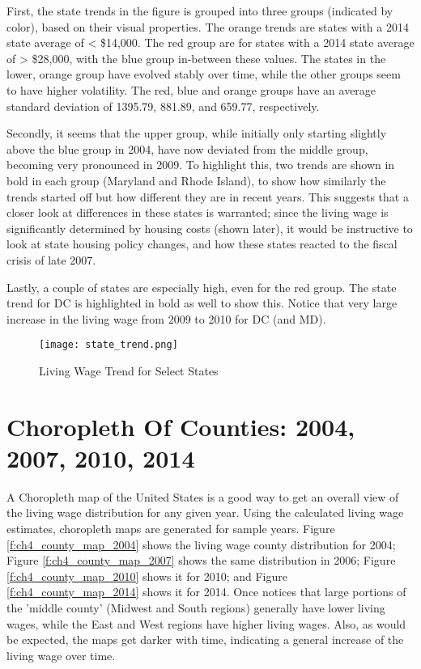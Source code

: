 First, the state trends in the figure is grouped into three groups (indicated by color), based on their visual properties. The orange trends are states with a 2014 state average of < \$14,000. The red group are for states with a 2014 state average of > \$28,000, with the blue group in-between these values. The states in the lower, orange group have evolved stably over time, while the other groups seem to have higher volatility. The red, blue and orange groups have an average standard deviation of 1395.79, 881.89, and 659.77, respectively.

Secondly, it seems that the upper group, while initially only starting slightly above the blue group in 2004, have now deviated from the middle group, becoming very pronounced in 2009. To highlight this, two trends are shown in bold in each group (Maryland and Rhode Island), to show how similarly the trends started off but how different they are in recent years. This suggests that a closer look at differences in these states is warranted; since the living wage is significantly determined by housing costs (shown later), it would be instructive to look at state housing policy changes, and how these states reacted to the fiscal crisis of late 2007.

Lastly, a couple of states are especially high, even for the red group. The state trend for DC is highlighted in bold as well to show this. Notice that very large increase in the living wage from 2009 to 2010 for DC (and MD).

\begin{figure}[H]
    \centering
        \texttt{[image: state\_trend.png]}
        \caption{Living Wage Trend for Select States}
    \label{f:ch4_state_trend}
\end{figure}



\section{Choropleth Of Counties: 2004, 2007, 2010, 2014}

A Choropleth map of the United States is a good way to get an overall view of the living wage distribution for any given year. Using the calculated living wage estimates, choropleth maps are generated for sample years. Figure \ref{f:ch4_county_map_2004} shows the living wage county distribution for 2004; Figure \ref{f:ch4_county_map_2007} shows the same distribution in 2006; Figure \ref{f:ch4_county_map_2010} shows it for 2010; and Figure \ref{f:ch4_county_map_2014} shows it for 2014. Once notices that large portions of the 'middle county' (Midwest and South regions) generally have lower living wages, while the East and West regions have higher living wages. Also, as would be expected, the maps get darker with time, indicating a general increase of the living wage over time.


